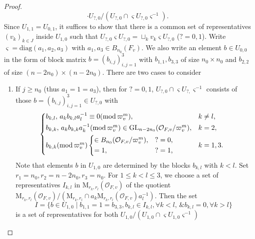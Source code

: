 \documentclass[10pt,a4paper]{amsart}
\begin{document}
\begin{proof}
\[		\cdot
		U_{?,0}/
		(U_{?,0}\cap
		\varsigma
		U_{?,0}
		\varsigma^{-1}).
		\]
		Since
		$U_{1,1}=U_{0,1}$,
		it suffices to show that there is a common set of
		representatives
		$(v_k)_{k\in J}$
		inside
		$U_{1,0}$
		such that
		$U_{?,0}\varsigma U_{?,0}
		=
		\sqcup_kv_k\varsigma U_{?,0}$
		($?=0,1$).
		Write
		$\varsigma=
		\mathrm{diag}(a_1,a_2,a_3)$
		with
		$a_1,a_3\in
		B_{n_0}
		(F_v)$.
		We also write an element
		$b\in
		U_{0,0}$
		in the form of block matrix
		$b=(b_{i,j})_{i,j=1}^3$
		with
		$b_{1,1},b_{3,3}$ of size
		$n_0\times n_0$
		and
		$b_{2,2}$ of size
		$(n-2n_0)\times(n-2n_0)$.
		There are two cases to consider
		\begin{enumerate}
			\item 
			If $j\geq n_0$
			(thus $a_1=1=a_3$),
			then for $?=0,1$,
			$U_{?,0}\cap
			\varsigma U_{?,}\varsigma^{-1}$
			consists of those
			$b=(b_{i,j})_{i,j=1}^3\in U_{?,0}$ with
			\[
			\begin{cases*}
				b_{k,l},\,
				a_kb_{k,l}a_l^{-1} 
				\equiv
				0
				(\mathrm{mod}\,\varpi_v^m),
				&
				$k\neq l$,
				\\
				b_{k,k},\,
				a_kb_{k,k}a_k^{-1}
				(\mathrm{mod}\,\varpi_v^m)
				\in
				\mathrm{GL}_{n-2n_0}(\mathcal{O}_{F,v}/\varpi_v^m),
				&
				$k=2$,
				\\
				b_{k,k}
				(\mathrm{mod}\,\varpi_v^m)
				\begin{cases*}
					\in
					B_{n_0}
					(\mathcal{O}_{F,v}/\varpi_v^m),
					&
					$?=0$,
					\\
					=1,
					&
					$?=1$,
				\end{cases*}
				&
				$k=1,3$.
			\end{cases*}
			\]
			Note that elements $b$ in
			$U_{1,0}$
			are determined by the blocks
			$b_{k,l}$
			with
			$k<l$.
			Set
			$r_1=n_0,r_2=n-2n_0,r_3=n_0$.
			For $1\leq k<l\leq3$,
			we choose a set of representatives
			$I_{k,l}$ in
			$\mathrm{M}_{r_k,r_l}
			(\mathcal{O}_{F,v})$
			of the quotient
			$\mathrm{M}_{r_k,r_l}
			(\mathcal{O}_{F,v})/
			(\mathrm{M}_{r_k,r_l}\cap
			a_k\mathrm{M}_{r_k,r_l}(\mathcal{O}_{F,v})a_l^{-1})$.
			Then the set
			\begin{equation}\label{set of representatives-1}
				I=
				\big\{
				b\in U_{1,0}\mid 
				b_{1,1}=1=b_{3,3},
				b_{k,l}\in I_{k,l},
				\forall k<l,
				\,
				\&
				b_{k,l}=0,
				\forall
				k>l
				\big\}
			\end{equation}
			is a set of representatives for both
			$U_{1,0}/(U_{1,0}\cap
			\varsigma U_{1,0}\varsigma^{-1})$	

\end{enumerate}
\end{proof}
\end{document}
